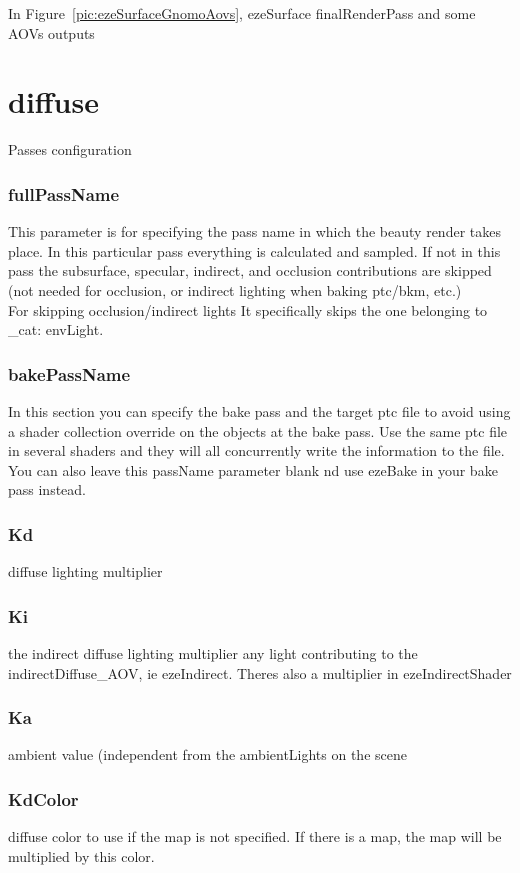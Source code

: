 \documentclass[final,letterpaper,twoside,12pt]{report}
\begin{document}
\noindent In Figure~{\ref{pic:ezeSurfaceGnomoAovs}}, ezeSurface finalRenderPass and some AOVs outputs
 
\section {diffuse}

Passes configuration


\subsubsection {fullPassName}
This parameter is for specifying the pass name in which the beauty render takes place.
In this particular pass everything is calculated and sampled. If not in this pass the subsurface, specular, indirect, and occlusion contributions are skipped (not needed for occlusion, or indirect lighting when baking ptc/bkm, etc.)\\
For skipping occlusion/indirect lights It specifically skips the one belonging to \_cat: envLight.\\
\subsubsection {bakePassName}
In this section you can specify the bake pass and the target ptc file to avoid using a shader collection override on the objects at the bake pass.
Use the same ptc file in several shaders and they will all concurrently write the information to the file.
You can also leave this passName parameter blank nd use ezeBake in your bake pass instead.
\smallskip
\subsubsection {Kd}
diffuse lighting multiplier 
\smallskip
\subsubsection {Ki}
the indirect diffuse lighting multiplier any light contributing to the indirectDiffuse\_AOV, ie ezeIndirect.
Theres also a multiplier in ezeIndirectShader
\smallskip
\subsubsection {Ka}
ambient value (independent from the ambientLights on the scene
\smallskip
\subsubsection {KdColor}
diffuse color to use if the map is not specified. If there is a map, the map will be multiplied by this color.
\smallskip
\end{document}
